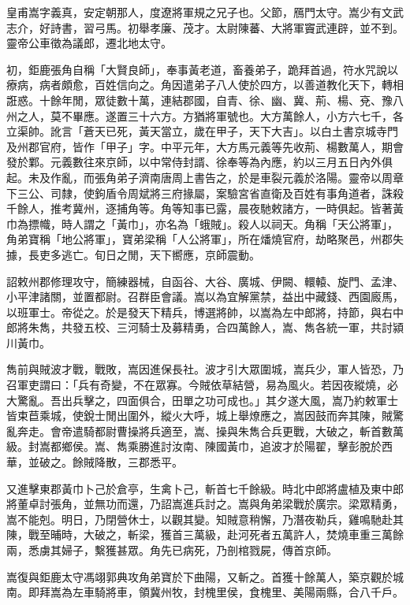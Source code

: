 
\begin{pinyinscope}
皇甫嵩字義真，安定朝那人，度遼將軍規之兄子也。父節，鴈門太守。嵩少有文武志介，好詩書，習弓馬。初舉孝廉、茂才。太尉陳蕃、大將軍竇武連辟，並不到。靈帝公車徵為議郎，遷北地太守。

初，鉅鹿張角自稱「大賢良師」，奉事黃老道，畜養弟子，跪拜首過，符水咒說以療病，病者頗愈，百姓信向之。角因遣弟子八人使於四方，以善道教化天下，轉相誑惑。十餘年閒，眾徒數十萬，連結郡國，自青、徐、幽、冀、荊、楊、兗、豫八州之人，莫不畢應。遂置三十六方。方猶將軍號也。大方萬餘人，小方六七千，各立渠帥。訛言「蒼天已死，黃天當立，歲在甲子，天下大吉」。以白土書京城寺門及州郡官府，皆作「甲子」字。中平元年，大方馬元義等先收荊、楊數萬人，期會發於鄴。元義數往來京師，以中常侍封諝、徐奉等為內應，約以三月五日內外俱起。未及作亂，而張角弟子濟南唐周上書告之，於是車裂元義於洛陽。靈帝以周章下三公、司隸，使鉤盾令周斌將三府掾屬，案驗宮省直衛及百姓有事角道者，誅殺千餘人，推考冀州，逐捕角等。角等知事已露，晨夜馳敕諸方，一時俱起。皆著黃巾為摽幟，時人謂之「黃巾」，亦名為「蛾賊」。殺人以祠天。角稱「天公將軍」，角弟寶稱「地公將軍」，寶弟梁稱「人公將軍」，所在燔燒官府，劫略聚邑，州郡失據，長吏多逃亡。旬日之閒，天下嚮應，京師震動。

詔敕州郡修理攻守，簡練器械，自函谷、大谷、廣城、伊闕、轘轅、旋門、孟津、小平津諸關，並置都尉。召群臣會議。嵩以為宜解黨禁，益出中藏錢、西園廄馬，以班軍士。帝從之。於是發天下精兵，博選將帥，以嵩為左中郎將，持節，與右中郎將朱雋，共發五校、三河騎士及募精勇，合四萬餘人，嵩、雋各統一軍，共討潁川黃巾。

雋前與賊波才戰，戰敗，嵩因進保長社。波才引大眾圍城，嵩兵少，軍人皆恐，乃召軍吏謂曰：「兵有奇變，不在眾寡。今賊依草結營，易為風火。若因夜縱燒，必大驚亂。吾出兵擊之，四面俱合，田單之功可成也。」其夕遂大風，嵩乃約敕軍士皆束苣乘城，使銳士閒出圍外，縱火大呼，城上舉燎應之，嵩因鼓而奔其陳，賊驚亂奔走。會帝遣騎都尉曹操將兵適至，嵩、操與朱雋合兵更戰，大破之，斬首數萬級。封嵩都鄉侯。嵩、雋乘勝進討汝南、陳國黃巾，追波才於陽翟，擊彭脫於西華，並破之。餘賊降散，三郡悉平。

又進擊東郡黃巾卜己於倉亭，生禽卜己，斬首七千餘級。時北中郎將盧植及東中郎將董卓討張角，並無功而還，乃詔嵩進兵討之。嵩與角弟梁戰於廣宗。梁眾精勇，嵩不能剋。明日，乃閉營休士，以觀其變。知賊意稍懈，乃潛夜勒兵，雞鳴馳赴其陳，戰至晡時，大破之，斬梁，獲首三萬級，赴河死者五萬許人，焚燒車重三萬餘兩，悉虜其婦子，繫獲甚眾。角先已病死，乃剖棺戮屍，傳首京師。

嵩復與鉅鹿太守馮翊郭典攻角弟寶於下曲陽，又斬之。首獲十餘萬人，築京觀於城南。即拜嵩為左車騎將車，領冀州牧，封槐里侯，食槐里、美陽兩縣，合八千戶。


\end{pinyinscope}
